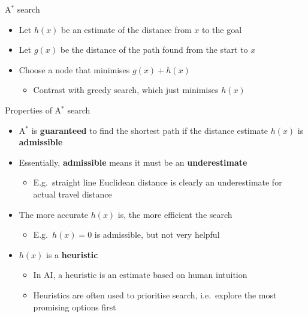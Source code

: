 \begin{frame}{A$^*$ search}
    \begin{itemize}
    	\pause\item Let $h(x)$ be an estimate of the distance from $x$ to the goal
    	\pause\item Let $g(x)$ be the distance of the path found from the start to $x$
    	\pause\item Choose a node that minimises $g(x) + h(x)$
		    \begin{itemize}
		    	\pause\item Contrast with greedy search, which just minimises $h(x)$
			\end{itemize}
    \end{itemize}
\end{frame}

\begin{frame}{Properties of A$^*$ search}
    \begin{itemize}
        \item A$^*$ is \textbf{guaranteed} to find the shortest path
            if the distance estimate $h(x)$ is \textbf{admissible} \pause
        \item Essentially, \textbf{admissible} means it must be an \textbf{underestimate} \pause
            \begin{itemize}
                \item E.g.\ straight line Euclidean distance is clearly an underestimate
                    for actual travel distance \pause
            \end{itemize}
        \item The more accurate $h(x)$ is, the more efficient the search \pause
            \begin{itemize}
                \item E.g.\ $h(x) = 0$ is admissible, but not very helpful \pause
            \end{itemize}
        \item $h(x)$ is a \textbf{heuristic} \pause
            \begin{itemize}
                \item In AI, a heuristic is an estimate based on human intuition \pause
                \item Heuristics are often used to prioritise search,
                    i.e.\ explore the most promising options first
            \end{itemize}
    \end{itemize}
\end{frame}

